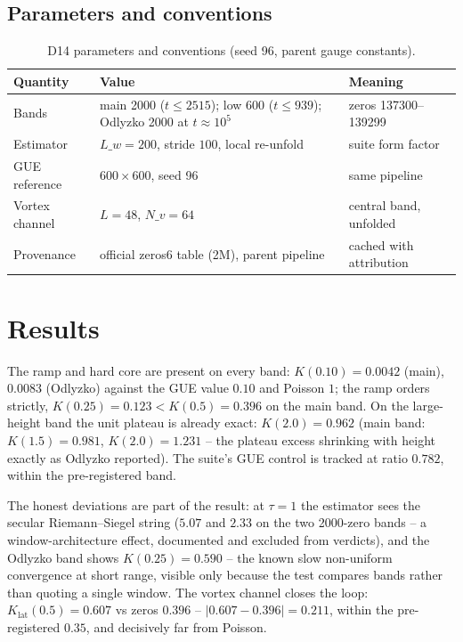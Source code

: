 \documentclass[11pt,a4paper]{article}
\begin{document}
\subsection{Parameters and conventions}
\begin{table}[htbp]\centering\small
\begin{tabularx}{\columnwidth}{@{}l l X@{}}
\toprule
Quantity & Value & Meaning \\
\midrule
Bands & main 2000 ($t \le 2515$); low 600 ($t \le 939$); Odlyzko 2000 at $t \approx 10^5$ & zeros 137300--139299 \\
Estimator & $L\_w = 200$, stride $100$, local re-unfold & suite form factor \\
GUE reference & $600\times600$, seed 96 & same pipeline \\
Vortex channel & $L = 48$, $N\_v = 64$ & central band, unfolded \\
Provenance & official zeros6 table (2M), parent pipeline & cached with attribution \\
\bottomrule
\end{tabularx}
\caption{D14 parameters and conventions (seed 96, parent gauge constants).}
\end{table}

\section{Results}
The ramp and hard core are present on every band: $K(0.10) = 0.0042$ (main), $0.0083$ (Odlyzko) against the GUE value $0.10$ and Poisson $1$; the ramp orders strictly, $K(0.25) = 0.123 < K(0.5) = 0.396$ on the main band. On the large-height band the unit plateau is already exact: $K(2.0) = 0.962$ (main band: $K(1.5) = 0.981$, $K(2.0) = 1.231$ -- the plateau excess shrinking with height exactly as Odlyzko reported). The suite's GUE control is tracked at ratio $0.782$, within the pre-registered band.

The honest deviations are part of the result: at $\tau = 1$ the estimator sees the secular Riemann--Siegel string ($5.07$ and $2.33$ on the two 2000-zero bands -- a window-architecture effect, documented and excluded from verdicts), and the Odlyzko band shows $K(0.25) = 0.590$ -- the known slow non-uniform convergence at short range, visible only because the test compares bands rather than quoting a single window. The vortex channel closes the loop: $K_{\mathrm{lat}}(0.5) = 0.607$ vs zeros $0.396$ -- $|0.607 - 0.396| = 0.211$, within the pre-registered $0.35$, and decisively far from Poisson.
\end{document}
